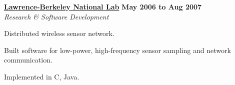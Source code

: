 \halfblankline

\href{http://www.lbl.gov/}{\textbf{Lawrence-Berkeley National Lab}} \hfill \textbf{May 2006 to Aug 2007}\\
\textit{Research \& Software Development}
\begin{innerlist}
  \item Distributed wireless sensor network.
  \item Built software for low-power, high-frequency sensor sampling and network communication.
  \item Implemented in C, Java.
\end{innerlist}

%
%
%
